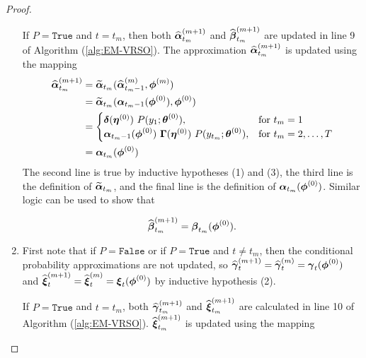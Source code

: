 \begin{proof}
\begin{enumerate}
        If $P = \texttt{True}$ and $t = t_m$, then both $\widehat {\boldsymbol{\alpha}}^{(m+1)}_{t_m}$ and $\widehat {\boldsymbol{\beta}}^{(m+1)}_{t_m}$ are updated in line 9 of Algorithm (\ref{alg:EM-VRSO}). The approximation $\widehat {\boldsymbol{\alpha}}^{(m+1)}_{t_m}$ is updated using the mapping 
        \begin{align}
            \widehat {\boldsymbol{\alpha}}^{(m+1)}_{t_m} &= \widetilde {\boldsymbol{\alpha}}_{t_m}(\widehat {\boldsymbol{\alpha}}^{(m)}_{t_m-1},\boldsymbol{\phi}^{(m)}) \nonumber \\
            &= \widetilde {\boldsymbol{\alpha}}_{t_m}(\boldsymbol{\alpha}_{t_m-1}(\boldsymbol{\phi}^{(0)}),\boldsymbol{\phi}^{(0)}) \nonumber \\
            &= 
            \begin{cases}
                \boldsymbol{\delta}(\boldsymbol{\eta}^{(0)}) ~ P(y_1;\boldsymbol{\theta}^{(0)}), & \text{for } t_m = 1 \\
                \boldsymbol{\alpha}_{t_m-1}(\boldsymbol{\phi}^{(0)}) ~ \boldsymbol{\Gamma}(\boldsymbol{\eta}^{(0)}) ~P(y_{t_m};\boldsymbol{\theta}^{(0)}), & \text{for } t_m = 2,\ldots,T
            \end{cases} \nonumber \\
            &= \boldsymbol{\alpha}_{t_m}(\boldsymbol{\phi}^{(0)}) \label{eqn:a_inductive_step}
        \end{align}
        The second line is true by inductive hypotheses (1) and (3), the third line is the definition of $\widetilde {\boldsymbol{\alpha}}_{t_m}$, and the final line is the definition of $\boldsymbol{\alpha}_{t_m}(\boldsymbol{\phi}^{(0)})$. Similar logic can be used to show that 
        
        \begin{equation}
            \widehat {\boldsymbol{\beta}}^{(m+1)}_{t_m} = \boldsymbol{\beta}_{t_m}(\boldsymbol{\phi}^{(0)}). \label{eqn:b_inductive_step}
        \end{equation}
        \item First note that if $P = \texttt{False}$ or if $P = \texttt{True}$ and $t \neq t_m$, then the conditional probability approximations are not updated, so $\widehat {\boldsymbol{\gamma}}^{(m+1)}_t = \widehat {\boldsymbol{\gamma}}^{(m)}_t = \boldsymbol{\gamma}_t(\boldsymbol{\phi}^{(0)})$ and $\widehat {\boldsymbol{\xi}}^{(m+1)}_t = \widehat {\boldsymbol{\xi}}^{(m)}_t = \boldsymbol{\xi}_t(\boldsymbol{\phi}^{(0)})$ by inductive hypothesis (2).
        
        If $P = \texttt{True}$ and $t = t_m$, both $\widehat {\boldsymbol{\gamma}}^{(m+1)}_{t_m}$ and $\widehat {\boldsymbol{\xi}}^{(m+1)}_{t_m}$ are calculated in line 10 of Algorithm (\ref{alg:EM-VRSO}). $\widehat {\boldsymbol{\xi}}^{(m+1)}_{t_m}$ is updated using the mapping 
        

\end{enumerate}
\end{proof}
